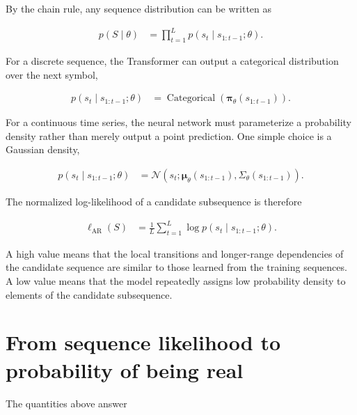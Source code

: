 \documentclass[a4paper]{article}
\begin{document}
        By the chain rule, any sequence distribution can be written as

        \begin{align}
            p(S\mid\theta)
            &=
            \prod_{t=1}^{L}
            p(s_t\mid s_{1:t-1};\theta).
        \end{align}

        \noindent
        For a discrete sequence, the Transformer can output a categorical distribution over the next symbol,

        \begin{align}
            p(s_t\mid s_{1:t-1};\theta)
            &=
            \operatorname{Categorical}
            \left(
            \boldsymbol{\pi}_\theta(s_{1:t-1})
            \right).
        \end{align}

        \noindent
        For a continuous time series, the neural network must parameterize a probability density rather than merely output a point prediction. One simple choice is a Gaussian density,

        \begin{align}
            p(s_t\mid s_{1:t-1};\theta)
            &=
            \mathcal{N}
            \left(
            s_t;
            \boldsymbol{\mu}_\theta(s_{1:t-1}),
            \Sigma_\theta(s_{1:t-1})
            \right).
        \end{align}

        \noindent
        The normalized log-likelihood of a candidate subsequence is therefore

        \begin{align}
            \ell_{\mathrm{AR}}(S)
            &=
            \frac{1}{L}
            \sum_{t=1}^{L}
            \log p(s_t\mid s_{1:t-1};\theta).
        \end{align}

        \noindent
        A high value means that the local transitions and longer-range dependencies of the candidate sequence are similar to those learned from the training sequences. A low value means that the model repeatedly assigns low probability density to elements of the candidate subsequence.

    \section{From sequence likelihood to probability of being real}

        The quantities above answer
\end{document}
